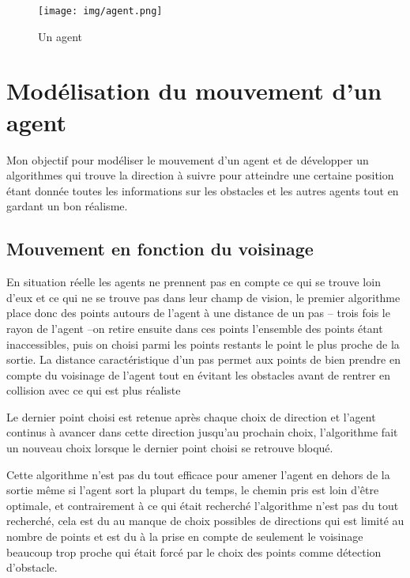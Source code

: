 \documentclass{article}
\begin{document}
\begin{figure}[h]
  \centering
  \texttt{[image: img/agent.png]}
  \caption{Un agent}
  \label{fig:agent}
\end{figure}


\section{Modélisation du mouvement d'un agent}

Mon objectif pour modéliser le mouvement d'un agent et de développer
un algorithmes qui trouve la direction à suivre pour atteindre
une certaine position étant donnée toutes les informations sur les
obstacles et les autres agents tout en gardant un bon réalisme.

\subsection{Mouvement en fonction du voisinage}

En situation réelle les agents ne prennent pas en compte ce qui se trouve
loin d'eux et ce qui ne se trouve pas dans leur champ de vision, le premier
algorithme place donc des points autours de l'agent à une distance de un pas
-- trois fois le rayon de l'agent --on retire ensuite dans ces points l'ensemble
des points étant inaccessibles, puis on choisi parmi les points restants le
point le plus proche de la sortie. La distance caractéristique d'un pas permet
aux points de bien prendre en compte du voisinage de l'agent tout en
évitant les obstacles avant de rentrer en collision avec ce qui est plus réaliste

Le dernier point choisi est retenue après chaque choix de direction et
l'agent continus à avancer dans cette direction jusqu'au prochain choix,
l'algorithme fait un nouveau choix lorsque le dernier point choisi se
retrouve bloqué. 

Cette algorithme n'est pas du tout efficace pour amener l'agent en dehors
de la sortie même si l'agent sort la plupart du temps, le chemin pris
est loin d'être optimale, et contrairement à ce qui était recherché
l'algorithme n'est pas du tout recherché, cela est du au manque de choix
possibles de directions qui est limité au nombre de points et est du à la
prise en compte de seulement le voisinage beaucoup trop proche qui était
forcé par le choix des points comme détection d'obstacle.
\end{document}
